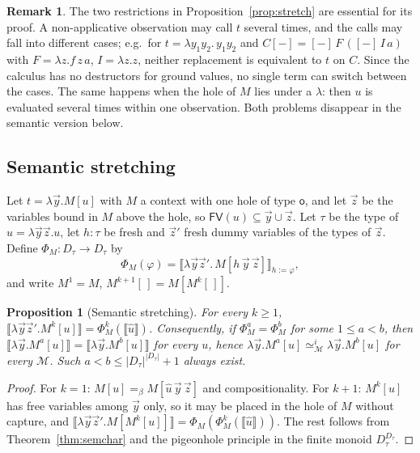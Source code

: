 \documentclass[11pt]{article}
\newcommand{\Ground}{\mathsf{o}\xspace}
\newcommand{\FV}{\mathsf{FV}\xspace}
\newcommand{\ObsEq}{\mathrel{\simeq}\xspace}
\newcommand{\sem}[1]{\llbracket #1\rrbracket}
\newtheorem{proposition}[theorem]{Proposition}
\theoremstyle{definition}
\newtheorem{remark}[theorem]{Remark}
\begin{document}
\begin{remark}\label{rem:multicall}
The two restrictions in Proposition~\ref{prop:stretch} are essential for
its proof.  A non-applicative observation may call $t$ several times, and
the calls may fall into different cases; e.g.\ for
$t=\lambda y_1y_2.\,y_1y_2$ and $C[-]=[-]\,F\,([-]\,I\,a)$ with
$F=\lambda z.f\,z\,a$, $I=\lambda z.z$, neither replacement is equivalent
to $t$ on $C$.  Since the calculus has no destructors for ground values, no
single term can switch between the cases.  The same happens when the hole
of $M$ lies under a $\lambda$: then $u$ is evaluated several times within
one observation.  Both problems disappear in the semantic version below.
\end{remark}

\subsection{Semantic stretching}

Let $t=\lambda\vec y.M[u]$ with $M$ a context with one hole of type
$\Ground$, and let $\vec z$ be the variables bound in $M$ above the hole,
so $\FV(u)\subseteq\vec y\cup\vec z$.  Let $\tau$ be the type of
$\hat u=\lambda\vec y\vec z.u$, let $h:\tau$ be fresh and $\vec z'$ fresh
dummy variables of the types of $\vec z$.  Define $\Phi_M:D_\tau\to D_\tau$
by
\[
  \Phi_M(\varphi)=\sem{\lambda\vec y\vec z'.\,M[h\,\vec y\,\vec z]}_{h:=\varphi},
\]
and write $M^1=M$, $M^{k+1}[\,]=M[M^k[\,]]$.

\begin{proposition}[Semantic stretching]\label{prop:semstretch}
For every $k\ge1$, $\sem{\lambda\vec y\vec z'.M^k[u]}=\Phi_M^k(\sem{\hat u})$.
Consequently, if $\Phi_M^a=\Phi_M^b$ for some $1\le a<b$, then
$\sem{\lambda\vec y.M^a[u]}=\sem{\lambda\vec y.M^b[u]}$ for every $u$, hence
$\lambda\vec y.M^a[u]\ObsEq^i_{\mathcal M}\lambda\vec y.M^b[u]$ for every
$\mathcal M$.  Such $a<b\le|D_\tau|^{|D_\tau|}+1$ always exist.
\end{proposition}
\begin{proof}
For $k=1$: $M[u]=_\beta M[\hat u\,\vec y\,\vec z]$ and compositionality.
For $k+1$: $M^k[u]$ has free variables among $\vec y$ only, so it may be
placed in the hole of $M$ without capture, and
$\sem{\lambda\vec y\vec z'.M[M^k[u]]}=\Phi_M(\Phi_M^k(\sem{\hat u}))$.
The rest follows from Theorem~\ref{thm:semchar} and the pigeonhole
principle in the finite monoid $D_\tau^{D_\tau}$.
\end{proof}
\end{document}
